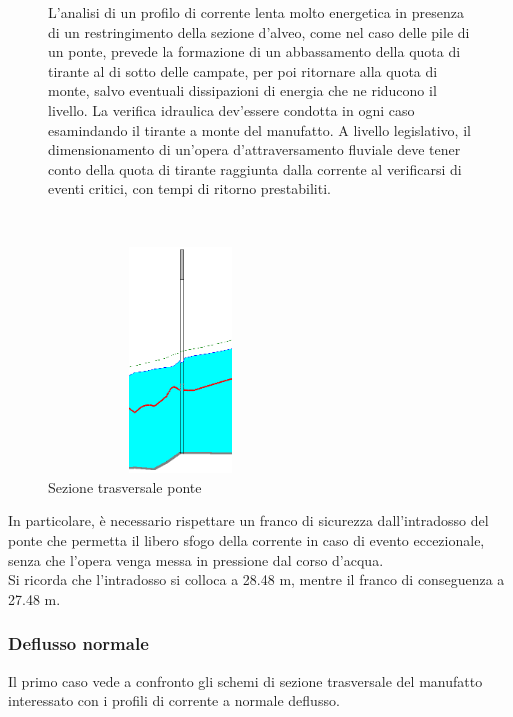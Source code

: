 \documentclass[12pt]{article} %
\begin{document}
\begin{figure}[H]
\begin{minipage}[b]{8.5cm}
L'analisi di un profilo di corrente lenta molto energetica in presenza di un restringimento della sezione d'alveo, come nel caso delle pile di un ponte, prevede la formazione di un abbassamento della quota di tirante al di sotto delle campate, per poi ritornare alla quota di monte, salvo eventuali dissipazioni di energia che ne riducono il livello. La verifica idraulica dev'essere condotta in ogni caso esamindando il tirante a monte del manufatto. A livello legislativo, il dimensionamento di un'opera d'attraversamento fluviale deve tener conto della quota di tirante raggiunta dalla corrente al verificarsi di eventi critici, con tempi di ritorno prestabiliti.

\end{minipage}
\ \hspace{2mm} \hspace{3mm} \
\begin{minipage}[b]{8.5cm}
    \centering
    \includegraphics[height=6cm, width=7cm]{Restringimento.PNG}
    \caption{Sezione trasversale ponte}
\end{minipage}
\end{figure}
 
\noindent
 In particolare, è necessario rispettare un franco di sicurezza dall'intradosso del ponte che permetta il libero sfogo della corrente in caso di evento eccezionale, senza che l'opera venga messa in pressione dal corso d'acqua.\\
\noindent Si ricorda che l'intradosso si colloca a 28.48 m, mentre il franco di conseguenza a 27.48 m.

\subsubsection{Deflusso normale}

\noindent Il primo caso vede a confronto gli schemi di sezione trasversale del manufatto interessato con i profili di corrente a normale deflusso.
\end{document}
